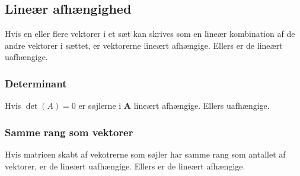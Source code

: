 \subsection{Lineær afhængighed}
Hvis en eller flere vektorer i et sæt kan skrives som en lineær kombination af de andre vektorer i sættet, er vektorerne lineært afhængige. Ellers er de lineært uafhængige.

\subsubsection{Determinant}
Hvis $\det(A) = 0$ er søjlerne i $\mathbf{A}$ lineært afhængige. Ellers uafhængige.


\subsubsection{Samme rang som vektorer}
Hvis matricen skabt af vekotrerne som søjler har samme rang som antallet af vektorer, er de lineært uafhængige. Ellers er de lineært afhængige.

